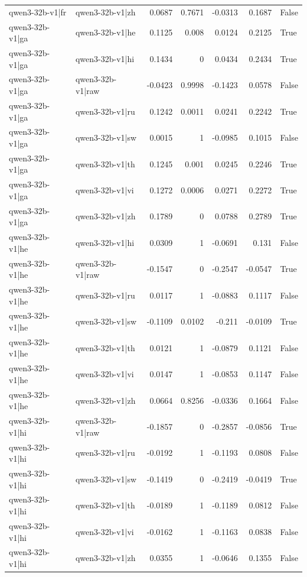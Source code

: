 \begin{table}
\begin{tabular}{l l r r r r l}
qwen3-32b-v1|fr & qwen3-32b-v1|zh & 0.0687 & 0.7671 & -0.0313 & 0.1687 & False \\
qwen3-32b-v1|ga & qwen3-32b-v1|he & 0.1125 & 0.008 & 0.0124 & 0.2125 & True \\
qwen3-32b-v1|ga & qwen3-32b-v1|hi & 0.1434 & 0 & 0.0434 & 0.2434 & True \\
qwen3-32b-v1|ga & qwen3-32b-v1|raw & -0.0423 & 0.9998 & -0.1423 & 0.0578 & False \\
qwen3-32b-v1|ga & qwen3-32b-v1|ru & 0.1242 & 0.0011 & 0.0241 & 0.2242 & True \\
qwen3-32b-v1|ga & qwen3-32b-v1|sw & 0.0015 & 1 & -0.0985 & 0.1015 & False \\
qwen3-32b-v1|ga & qwen3-32b-v1|th & 0.1245 & 0.001 & 0.0245 & 0.2246 & True \\
qwen3-32b-v1|ga & qwen3-32b-v1|vi & 0.1272 & 0.0006 & 0.0271 & 0.2272 & True \\
qwen3-32b-v1|ga & qwen3-32b-v1|zh & 0.1789 & 0 & 0.0788 & 0.2789 & True \\
qwen3-32b-v1|he & qwen3-32b-v1|hi & 0.0309 & 1 & -0.0691 & 0.131 & False \\
qwen3-32b-v1|he & qwen3-32b-v1|raw & -0.1547 & 0 & -0.2547 & -0.0547 & True \\
qwen3-32b-v1|he & qwen3-32b-v1|ru & 0.0117 & 1 & -0.0883 & 0.1117 & False \\
qwen3-32b-v1|he & qwen3-32b-v1|sw & -0.1109 & 0.0102 & -0.211 & -0.0109 & True \\
qwen3-32b-v1|he & qwen3-32b-v1|th & 0.0121 & 1 & -0.0879 & 0.1121 & False \\
qwen3-32b-v1|he & qwen3-32b-v1|vi & 0.0147 & 1 & -0.0853 & 0.1147 & False \\
qwen3-32b-v1|he & qwen3-32b-v1|zh & 0.0664 & 0.8256 & -0.0336 & 0.1664 & False \\
qwen3-32b-v1|hi & qwen3-32b-v1|raw & -0.1857 & 0 & -0.2857 & -0.0856 & True \\
qwen3-32b-v1|hi & qwen3-32b-v1|ru & -0.0192 & 1 & -0.1193 & 0.0808 & False \\
qwen3-32b-v1|hi & qwen3-32b-v1|sw & -0.1419 & 0 & -0.2419 & -0.0419 & True \\
qwen3-32b-v1|hi & qwen3-32b-v1|th & -0.0189 & 1 & -0.1189 & 0.0812 & False \\
qwen3-32b-v1|hi & qwen3-32b-v1|vi & -0.0162 & 1 & -0.1163 & 0.0838 & False \\
qwen3-32b-v1|hi & qwen3-32b-v1|zh & 0.0355 & 1 & -0.0646 & 0.1355 & False \\

\end{tabular}
\end{table}
